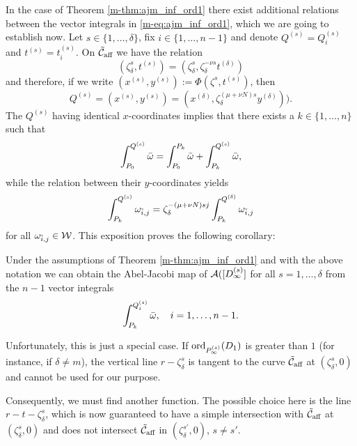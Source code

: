\documentclass[main.tex]{subfiles}
\begin{document}
    In the case of Theorem \ref{m-thm:ajm_inf_ord1} there exist additional relations between the vector integrals in 
    \eqref{m-eq:ajm_inf_ord1}, which we are going to establish now.
    Let $s \in \{1,\dots,\delta\}$, fix $i \in \{1,\dots,n-1\}$ and denote $Q^{(s)} = Q_i^{(s)}$ and $t^{(s)} = t_i^{(s)}$.
    On $\tilde{\mathcal{C}}_{\text{aff}}$ we have the relation
     \begin{equation}
	( \zeta_{\delta}^s,t^{(s)} ) = ( \zeta_{\delta}^s, \zeta_{\delta}^{-\nu s} t^{(\delta)} )
     \end{equation}
     and therefore, if we write $(x^{(s)},y^{(s)}) :=  \Phi( \zeta^s,t^{(s)})$, then
     \begin{equation}
      Q^{(s)} = (x^{(s)},y^{(s)}) = (x^{(\delta)},\zeta_{\delta}^{(\mu+\nu N)s} y^{(\delta)})).
     \end{equation}
     The $Q^{(s)}$ having identical $x$-coordinates implies that there exists a $k \in \{1,\dots,n\}$ such that
     \begin{equation}
      \int_{P_0}^{Q^{(s)}} \bar{\omega} =  \int_{P_0}^{P_k} \bar{\omega}  +  \int_{P_k}^{Q^{(s)}}  \bar{\omega},
     \end{equation}
     while the relation between their $y$-coordinates yields
     \begin{equation}
       \int_{P_k}^{Q^{(s)}} \omega_{\tilde{i},j} = \zeta_{\delta}^{-(\mu+\nu N)sj} \int_{P_k}^{Q^{(\delta)}} \omega_{\tilde{i},j} 
     \end{equation}
     for all $\omega_{\tilde{i},j} \in \mathcal{W}$. This exposition proves the following corollary:
     
    \begin{coro}\label{coro:ajm_inf_ord1}
    Under the assumptions of Theorem \ref{m-thm:ajm_inf_ord1} and with the above notation we can obtain the Abel-Jacobi map
    of $\mathcal{A}( [D_{\infty}^{(s)}]$ for all $s = 1,\dots,\delta$ from the $n-1$ vector integrals
    \begin{equation}
     \int_{P_k}^{Q_i^{(s)}} \bar{\omega}, \quad i = 1,\dots,n-1.
    \end{equation}
    \end{coro}
   

    \bigskip
    
    Unfortunately, this is just a special case. If $\operatorname{ord}_{P_{\infty}^{(s)}}(D_1)$ is greater than $1$ (for instance, if $\delta \ne m$),
     the vertical line $r-\zeta_{\delta}^s$ is tangent to the curve $\tilde{\mathcal{C}}_{\text{aff}}$ 
    at $(\zeta_{\delta}^s,0)$ and cannot be used for our purpose.
    
    Consequently, we must find another function. The possible choice here is the line $r - t -  \zeta_{\delta}^s$, which
    is now guaranteed to have a simple intersection with $\tilde{\mathcal{C}}_{\text{aff}}$ 
    at $(\zeta_{\delta}^s,0)$ and does not intersect $\tilde{\mathcal{C}}_{\text{aff}}$ in $(\zeta_{\delta}^{s'},0)$, $s \ne s'$.
\end{document}
